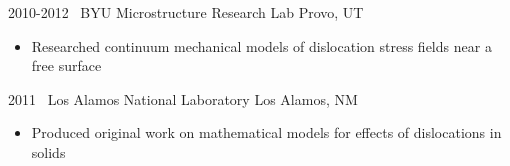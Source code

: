 \begin{entrylist}
\entry
{2010-2012}
{~BYU Microstructure Research Lab}
{Provo, UT}
{
\begin{itemize}
	\item Researched continuum mechanical models of dislocation stress fields near a free surface
\end{itemize}
}
\entry
{2011}
{~Los Alamos National Laboratory}
{Los Alamos, NM}
{
\begin{itemize}
	\item Produced original work on mathematical models for effects of dislocations in solids
\end{itemize}
}
\end{entrylist}